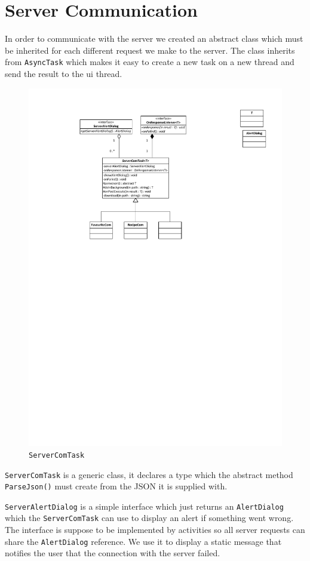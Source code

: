 \section{Server Communication}
In order to communicate with the server we created an abstract class which must be inherited for each different request we make to the server. The class inherits from \lstinline|AsyncTask| which makes it easy to create a new task on a new thread and send the result to the \ac{ui} thread.

\begin{figure}[H]
\centering
\includegraphics[width=0.7\linewidth, page=2]{img/servercomtask.pdf}
\caption{\lstinline|ServerComTask|}
\label{fig:servercomtask}
\end{figure}
\lstinline|ServerComTask| is a generic class, it declares a type which the abstract method \lstinline|ParseJson()| must create from the JSON it is supplied with.

\lstinline|ServerAlertDialog| is a simple interface which just returns an \lstinline|AlertDialog| which the \lstinline|ServerComTask| can use to display an alert if something went wrong. The interface is suppose to be implemented by activities so all server requests can share the \lstinline|AlertDialog| reference. We use it to display a static message that notifies the user that the connection with the server failed.

